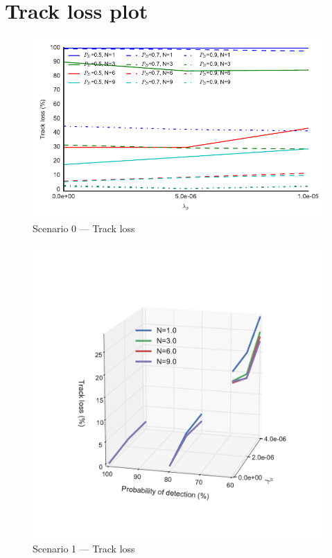 
\chapter{Track loss plot}
{
\setlength{\intextsep}{0mm}
\begin{figure}[H]
\centering
\includegraphics[height = .45\textheight]{Figures/plots/Scenario0_Tracking-TrackLoss.pdf}
\caption{Scenario 0 --- Track loss}\label{fig:scenario0_track_loss}
\end{figure}

\begin{figure}
\centering
\includegraphics[height = .45\textheight]{Figures/plots/Scenario1_Tracking-TrackLoss.pdf}
\caption{Scenario 1 --- Track loss}\label{fig:scenario1_track_loss}


\end{figure}}
